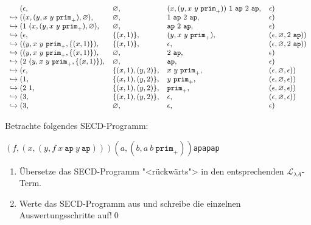 \begin{displaymath}
  \small
  \begin{array}{l@{}llll}
&(\epsilon, &\varnothing, &(x, (y, x~y~\mathtt{prim}_+))~1~\mathtt{ap}~2~\mathtt{ap}, &\epsilon)\\
\hookrightarrow{}&((x, (y, x~y~\mathtt{prim}_+), \varnothing), &\varnothing, &1~\mathtt{ap}~2~\mathtt{ap}, &\epsilon)\\
\hookrightarrow{}&(1~(x, (y, x~y~\mathtt{prim}_+), \varnothing), &\varnothing, &\mathtt{ap}~2~\mathtt{ap}, &\epsilon)\\
\hookrightarrow{}&(\epsilon, &\{(x, 1)\}, &(y, x~y~\mathtt{prim}_+), &(\epsilon, \varnothing, 2~\mathtt{ap}))\\
\hookrightarrow{}&((y, x~y~\mathtt{prim}_+, \{(x, 1)\}), &\{(x, 1)\}, &\epsilon, &(\epsilon, \varnothing, 2~\mathtt{ap}))\\
\hookrightarrow{}&((y, x~y~\mathtt{prim}_+, \{(x, 1)\}), &\varnothing, &2~\mathtt{ap}, &\epsilon)\\
\hookrightarrow{}&(2~(y, x~y~\mathtt{prim}_+, \{(x, 1)\}), &\varnothing, &\mathtt{ap}, &\epsilon)\\
\hookrightarrow{}&(\epsilon, &\{(x, 1), (y, 2)\}, &x~y~\mathtt{prim}_+, &(\epsilon, \varnothing, \epsilon))\\
\hookrightarrow{}&(1, &\{(x, 1), (y, 2)\}, &y~\mathtt{prim}_+, &(\epsilon, \varnothing, \epsilon))\\
\hookrightarrow{}&(2~1, &\{(x, 1), (y, 2)\}, &\mathtt{prim}_+, &(\epsilon, \varnothing, \epsilon))\\
\hookrightarrow{}&(3, &\{(x, 1), (y, 2)\}, &\epsilon, &(\epsilon, \varnothing, \epsilon))\\
\hookrightarrow{}&(3, &\varnothing, &\epsilon, &\epsilon)
  \end{array}
\end{displaymath}
%
\begin{aufgabeinline}
 Betrachte folgendes SECD-Programm:
 \newcommand{\tuple}[2]{\ensuremath{(#1,#2)}}
%
 \begin{center}
   \tuple{f}{\tuple{x}{\tuple{y}{f\:x\:\texttt{ap}\:y\:\texttt{ap}}}}\:\tuple{a}{\tuple{b}{a\:b\:\texttt{prim}_+}}\:\texttt{ap}\:\texttt{ap}\:\texttt{ap}
 \end{center}
 \begin{enumerate}
   \item Übersetze das SECD-Programm "<rückwärts"> in den entsprechenden
   $\mathcal{L}_{\lambda{}A}$-Term.
   \item Werte das SECD-Programm aus und schreibe die einzelnen
     Auswertungsschritte auf!\qed
 \end{enumerate}
\end{aufgabeinline}
